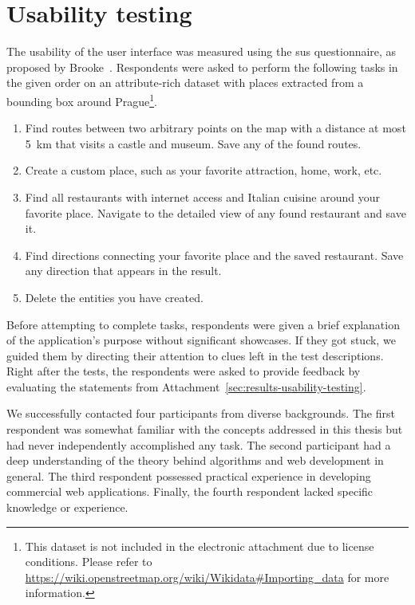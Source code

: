 \newpage

\section{Usability testing}\label{sec:user-testing}


The usability of the user interface was measured using the \ac{sus} questionnaire, as proposed by Brooke~\cite{brooke96}. Respondents were asked to perform the following tasks in the given order on an attribute-rich dataset with places extracted from a bounding box around Prague\footnote{This dataset is not included in the electronic attachment due to license conditions. Please refer to \href{https://wiki.openstreetmap.org/wiki/Wikidata\#Importing\_data}{https://wiki.openstreetmap.org/wiki/Wikidata\#Importing\_data} for more information.}.

\begin{enumerate}
\item Find routes between two arbitrary points on the map with a distance at most 5~km that visits a castle and museum. Save any of the found routes.
\item Create a custom place, such as your favorite attraction, home, work, etc.
\item Find all restaurants with internet access and Italian cuisine around your favorite place. Navigate to the detailed view of any found restaurant and save it.
\item Find directions connecting your favorite place and the saved restaurant. Save any direction that appears in the result.
\item Delete the entities you have created.
\end{enumerate}

Before attempting to complete tasks, respondents were given a brief explana\-tion of the application's purpose without significant showcases. If they got stuck, we guided them by directing their attention to clues left in the test descriptions. Right after the tests, the respondents were asked to provide feedback by eval\-u\-at\-ing the statements from Attachment~\ref{sec:results-usability-testing}.

We successfully contacted four participants from diverse backgrounds. The first respondent was somewhat familiar with the concepts addressed in this thesis but had never independently accomplished any task. The second participant had a deep understanding of the theory behind algorithms and web development in general. The third respondent possessed practical experience in developing commercial web applications. Finally, the fourth respondent lacked specific knowledge or experience.

